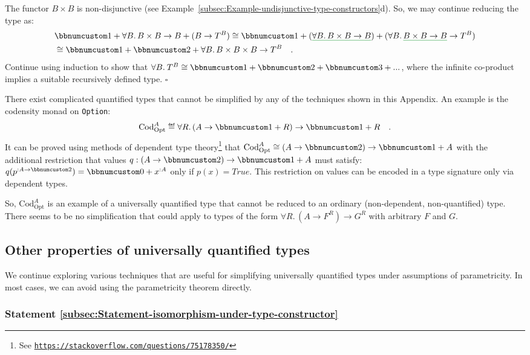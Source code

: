 The functor $B\times B$ is non-disjunctive (see Example~\ref{subsec:Example-undisjunctive-type-constructors}d).
So, we may continue reducing the type as:
\begin{align*}
 & \bbnum 1+\forall B.\,B\times B\rightarrow B+(B\rightarrow T^{B})\cong\bbnum 1+(\gunderline{\forall B.\,B\times B\rightarrow B})+(\forall B.\,\gunderline{B\times B\rightarrow B}\rightarrow T^{B})\\
 & \cong\bbnum 1+\bbnum 2+\forall B.\,B\times B\times B\rightarrow T^{B}\quad.
\end{align*}
Continue using induction to show that $\forall B.\:T^{B}\cong\bbnum 1+\bbnum 2+\bbnum 3+...$,
where the infinite co-product implies a suitable recursively defined
type. $\square$

There exist complicated quantified types that cannot be simplified
by any of the techniques shown in this Appendix. An example is the
codensity monad on \lstinline!Option!:
\[
\text{Cod}_{\text{Opt}}^{A}\triangleq\forall R.\,(A\rightarrow\bbnum 1+R)\rightarrow\bbnum 1+R\quad.
\]
It can be proved using methods of dependent type theory\footnote{See \texttt{\href{https://stackoverflow.com/questions/75178350/}{https://stackoverflow.com/questions/75178350/}}}
that $\text{Cod}_{\text{Opt}}^{A}\cong(A\rightarrow\bbnum 2)\rightarrow\bbnum 1+A$
with the additional restriction that values $q:(A\rightarrow\bbnum 2)\rightarrow\bbnum 1+A$
must satisfy: $q(p^{:A\rightarrow\bbnum 2})=\bbnum 0+x^{:A}$ only
if $p(x)=True$. This restriction on values can be encoded in a type
signature only via dependent types.

So, $\text{Cod}_{\text{Opt}}^{A}$ is an example of a universally
quantified type that cannot be reduced to an ordinary (non-dependent,
non-quantified) type. There seems to be no simplification that could
apply to types of the form $\forall R.\,(A\rightarrow F^{R})\rightarrow G^{R}$
with arbitrary $F$ and $G$.

\subsection{Other properties of universally quantified types}

We continue exploring various techniques that are useful for simplifying
universally quantified types under assumptions of parametricity. In
most cases, we can avoid using the parametricity theorem directly.

\subsubsection{Statement \label{subsec:Statement-isomorphism-under-type-constructor}\ref{subsec:Statement-isomorphism-under-type-constructor}}

